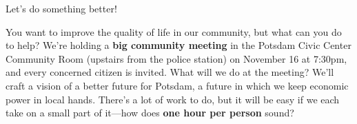 \documentclass[12pt]{article}
\begin{document}
{\begin{center}
\vspace{0.05in}

{\huge Let's do something better!}

\vspace{0.05in}

\begin{minipage}{0.95\textwidth}
{\BottomTextSize
You want to improve the quality of life in our community, but what can you do to help?
We're holding a {\bf big community meeting} in the Potsdam Civic Center Community Room (upstairs from the police station) on November 16 at 7:30pm, and every concerned citizen is invited. 
What will we do at the meeting?
We'll craft a vision of a better future for Potsdam, a future in which we keep economic power in local hands.  
There's a lot of work to do, but it will be easy if we each take on a small part of it---how does {\bf one hour per person} sound?
}
\end{minipage}

\end{center}


}
\end{document}
